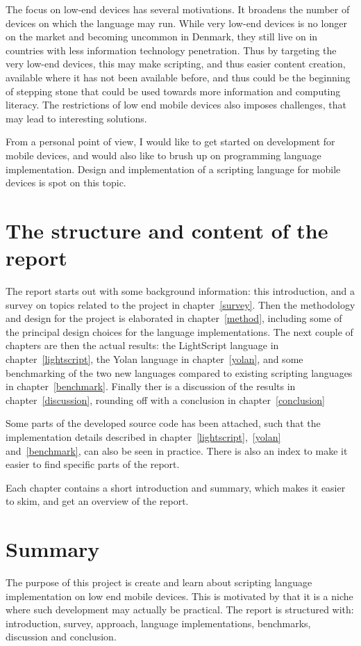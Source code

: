The focus on low-end devices has several motivations.
It broadens the number of devices on which the language may run.
While very low-end devices is no longer on the market and becoming uncommon in Denmark,
they still live on in countries with less information technology penetration.
Thus by targeting the very low-end devices, 
this may make scripting, and thus easier content creation,
available where it has not been available before,
and thus could be the beginning of stepping stone that could be used
towards more information and computing literacy.
The restrictions of low end mobile devices also imposes challenges, that may lead to interesting solutions.

From a personal point of view, 
I would like to get started on development for mobile devices, 
and would also like to brush up on programming language implementation.
Design and implementation of a scripting language for mobile devices is spot on this topic.


\section{The structure and content of the report}

The report starts out with some background information: this introduction, and a survey on topics related to the project in chapter~\ref{survey}.
Then the methodology and design for the project is elaborated in chapter~\ref{method}, including some of the principal design choices for the language implementations.
The next couple of chapters are then the actual results: the LightScript language in chapter~\ref{lightscript}, the Yolan language in chapter~\ref{yolan}, and some benchmarking of the two new languages compared to existing scripting languages in chapter~\ref{benchmark}.
Finally ther is a discussion of the results in chapter~\ref{discussion}, rounding off with a conclusion in chapter~\ref{conclusion}

Some parts of the developed source code has been attached, such that the implementation details described in chapter~\ref{lightscript},~\ref{yolan} and~\ref{benchmark}, can also be seen in practice.
There is also an index to make it easier to find specific parts of the report.

Each chapter contains a short introduction and summary, which makes it easier to skim, and get an overview of the report.

\section{Summary}
The purpose of this project is create and learn about scripting language implementation on low end mobile devices.
This is motivated by that it is a niche where such development may actually be practical.
The report is structured with: introduction, survey, approach, language implementations, benchmarks, discussion and conclusion.

